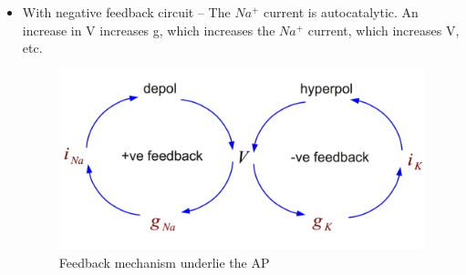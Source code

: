\documentclass[english,11pt]{article}
\begin{document}
\begin{itemize}
\item With negative feedback circuit --
The $Na^+$ current is autocatalytic. An increase
in V increases g, which increases the $Na^+$
current, which increases V, etc.

\begin{figure}[htbp]
\centering
  \includegraphics[scale=0.3]{images/5_7.jpg}
  \caption{Feedback mechanism underlie the AP}
\end{figure} 



\end{itemize}
\end{document}

